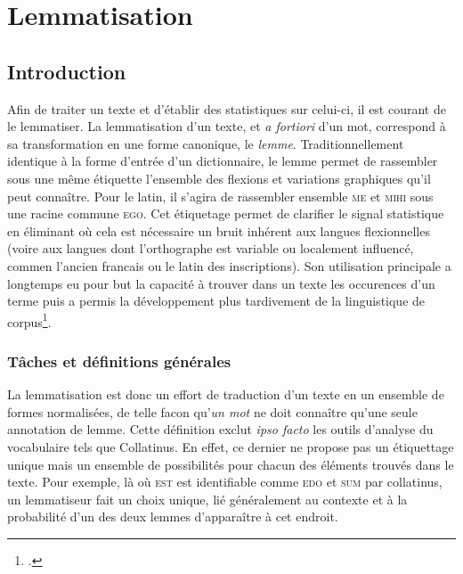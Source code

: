 \section{Lemmatisation}
\label{sec:lemmatiseurs}

\subsection{Introduction}
\label{subsec:lemma_intro}

Afin de traiter un texte et d'établir des statistiques sur celui-ci, il est courant de le lemmatiser. La lemmatisation d'un texte, et \textit{a fortiori} d'un mot, correspond à sa transformation en une forme canonique, le \textit{lemme}. Traditionnellement identique à la forme d'entrée d'un dictionnaire, le lemme permet de rassembler sous une même étiquette l'ensemble des flexions et variations graphiques qu'il peut connaître. Pour le latin, il s'agira de rassembler ensemble \textsc{me} et \textsc{mihi} sous une racine commune \textsc{ego}. Cet étiquetage permet de clarifier le signal statistique en éliminant où cela est nécessaire un bruit inhérent aux langues flexionnelles (voire aux langues dont l'orthographe est variable ou localement influencé, commen l'ancien francais ou le latin des inscriptions). Son utilisation principale a longtemps eu pour but la capacité à trouver dans un texte les occurences d'un terme puis a permis la développement plus tardivement de la linguistique de corpus\footcite{mellet2002atouts}.

\subsubsection{Tâches et définitions générales}

La lemmatisation est donc un effort de traduction d'un texte en un ensemble de formes normalisées, de telle facon qu'\textit{un mot} ne doit connaître qu'une seule annotation de lemme. Cette définition exclut \textit{ipso facto} les outils d'analyse du vocabulaire tels que Collatinus. En effet, ce dernier ne propose pas un étiquettage unique mais un ensemble de possibilités pour chacun des éléments trouvés dans le texte. Pour exemple, là où \textsc{est} est identifiable comme \textsc{edo} et \textsc{sum} par collatinus, un lemmatiseur fait un choix unique, lié généralement au contexte et à la probabilité d'un des deux lemmes d'apparaître à cet endroit.

